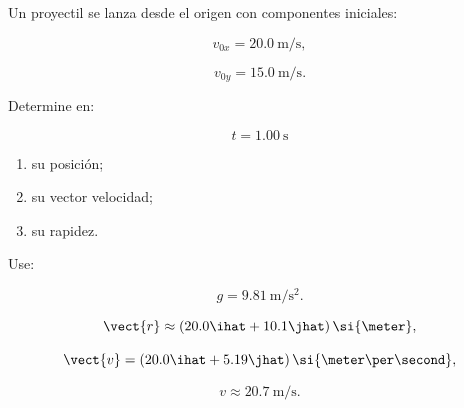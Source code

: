 \begin{ejercicio}
Un proyectil se lanza desde el origen con componentes iniciales:

\[
v_{0x}=\SI{20.0}{\meter\per\second},
\]

\[
v_{0y}=\SI{15.0}{\meter\per\second}.
\]

Determine en:

\[
t=\SI{1.00}{\second}
\]

\begin{enumerate}[label=\alph*)]
    \item su posición;
    \item su vector velocidad;
    \item su rapidez.
\end{enumerate}

Use:

\[
g=\SI{9.81}{\meter\per\second\squared}.
\]
\end{ejercicio}

\begin{respuesta}
\[
\vect{r}
\approx
(20.0\ihat+10.1\jhat)\,\si{\meter},
\]

\[
\vect{v}
=
(20.0\ihat+5.19\jhat)
\,\si{\meter\per\second},
\]

\[
\boxed{
v\approx\SI{20.7}{\meter\per\second}
}.
\]
\end{respuesta}

